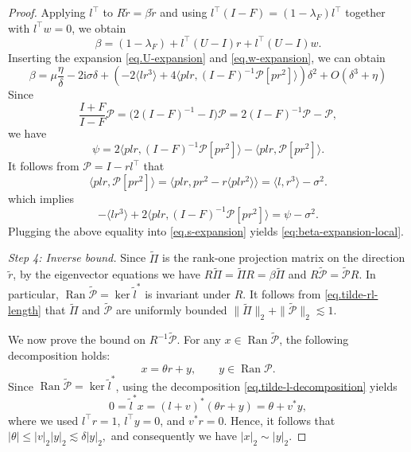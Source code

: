 \documentclass[11pt,twoside, a4paper]{article}
\numberwithin{equation}{section}
\numberwithin{figure}{section}
\theoremstyle{plain} %
\theoremstyle{definition}
\theoremstyle{remark}
\newcommand{\1} {\mspace{1 mu}}
\newcommand{\2} {\mspace{2 mu}}
\DeclareMathOperator{\Ran}{Ran}
\begin{document}
\begin{proof}
\medskip
Applying \(l^\top\) to
$
R\tilde r=\beta\tilde r
$
and using \(l^\top(I-F)=(1-\lambda_F)l^\top\) together with \(l^\top w=0\), we obtain
\begin{equation}\label{eq:bad-scalar-right}
\beta
=
(1-\lambda_F)
+l^\top(U-I)r
+l^\top(U-I)w.
\end{equation}
Inserting the expansion \eqref{eq.U-expansion} and \eqref{eq.w-expansion}, we can obtain
\begin{equation}\label{eq.s-expansion}
  \beta=\mu\frac{\eta}{\delta}-2\mathrm i\sigma\delta+\left(-2\langle lr^3\rangle +4\langle plr,(I-F)^{-1}\mathcal{P}[pr^2]\rangle\right)\delta^2+O(\delta^3+\eta)
\end{equation}
Since
\[
\frac{I+F}{I-F}\mathcal{P}
=
\bigl(2(I-F)^{-1}-I\bigr)\mathcal{P}
=
2(I-F)^{-1}\mathcal{P}-\mathcal{P},
\]
we have
\[
\psi
=
2\langle plr,(I-F)^{-1}\mathcal{P} [pr^2]\rangle-\langle plr,\mathcal{P} [pr^2]\rangle.
\]
It follows from \(\mathcal{P}=I-rl^\top\) that
\[
\langle plr,\mathcal{P} [pr^2]\rangle
=
\langle plr,pr^2-r\langle plr^2\rangle\rangle
=
\langle l,r^3\rangle-\sigma^2.
\]
which implies 
\[
-\langle lr^3\rangle+2\langle plr,(I-F)^{-1}\mathcal{P} [pr^2]\rangle =\psi-\sigma^2 .
\]
Plugging the above equality into \eqref{eq.s-expansion} yields \eqref{eq:beta-expansion-local}.

\medskip
\textit{Step 4: Inverse bound.}
Since $\widetilde{\Pi}$ is the rank-one projection matrix on the direction $\tilde r$, by the eigenvector equations we have
$
R\widetilde \Pi=\widetilde \Pi R=\beta \widetilde{\Pi}$ and 
$
R\widetilde{\mathcal{P}}=\widetilde{\mathcal{P}}R .
$
In particular, \(\operatorname{Ran}\widetilde{\mathcal{P}}
=\ker \tilde l^*\) is invariant under \(R\).
It follows from \eqref{eq.tilde-rl-length} that \(\widetilde{\Pi}\) and \(\widetilde{\mathcal{P}}\) are uniformly bounded
$
\|\widetilde{\Pi}\|_2+\|\widetilde{\mathcal{P}}\|_2\lesssim 1 .
$

We now prove the bound on \(R^{-1}\widetilde{\mathcal{P}}\). 
For any \(x\in \Ran \widetilde{\mathcal{P}}\), the following decomposition holds:
\[
x=\theta r+y,
\qquad
y\in \operatorname{Ran}\mathcal{P} .
\]
Since $\Ran \widetilde{\mathcal{P}}=\ker \tilde l^*$, using the decomposition \eqref{eq.tilde-l-decomposition} yields
\[
0=\tilde l^*x=(l+v)^*(\theta r+y)
=\theta+v^*y,
\]
where we used \(l^\top r=1\), \(l^\top y=0\), and \(v^*r=0\). Hence, it follows that
$
|\theta|\le |v|_2|y|_2\lesssim \delta |y|_2,
$
and consequently we have
$
|x|_2\sim |y|_2.
$


\end{proof}
\end{document}

